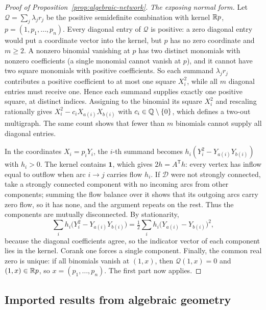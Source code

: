 \begin{proof}[Proof of Proposition~\ref{prop:algebraic-network}]
\emph{The exposing normal form.} Let $\mathcal Q=\sum_j\lambda_jr_j$ be the
positive semidefinite combination with kernel $\mathbb R p$, $p=(1,p_1,\ldots,p_n)$.
Every diagonal entry of $\mathcal Q$ is positive: a zero diagonal entry would
put a coordinate vector into the kernel, but $p$ has no zero coordinate and
$m\ge2$. A nonzero binomial vanishing at $p$ has two distinct monomials with
nonzero coefficients (a single monomial cannot vanish at $p$), and it cannot
have two square monomials with positive coefficients. So each summand
$\lambda_jr_j$ contributes a positive coefficient to at most one square
$X_i^2$, while all $m$ diagonal entries must receive one. Hence each summand
supplies exactly one positive square, at distinct indices. Assigning to the
binomial its square $X_i^2$ and rescaling rationally gives
$X_i^2-c_iX_{a(i)}X_{b(i)}$ with $c_i\in\mathbb Q\setminus\{0\}$, which defines a
two-out multigraph. The same count shows that fewer than $m$ binomials cannot
supply all diagonal entries.

In the coordinates $X_i=p_iY_i$, the $i$-th summand becomes
$h_i(Y_i^2-Y_{a(i)}Y_{b(i)})$ with $h_i>0$. The kernel contains
$\mathbf1$, which gives $2h=A^{\mathsf T}h$: every vertex has inflow equal to
outflow when arc $i\to j$ carries flow $h_i$. If $\mathcal D$ were not
strongly connected, take a strongly connected component with no incoming
arcs from other components; summing the flow balance over it shows that its
outgoing arcs carry zero flow, so it has none, and the argument repeats on
the rest. Thus the components are mutually disconnected. By stationarity,
\[
 \sum_ih_i\bigl(Y_i^2-Y_{a(i)}Y_{b(i)}\bigr)
 =\tfrac12\sum_ih_i\bigl(Y_{a(i)}-Y_{b(i)}\bigr)^2,
\]
because the diagonal coefficients agree, so the indicator vector of each
component lies in the kernel. Corank one forces a single component. Finally,
the common real zero is unique: if all binomials vanish at $(1,x)$, then
$\mathcal Q(1,x)=0$ and $(1,x)\in\mathbb R p$, so $x=(p_1,\ldots,p_n)$. The first part
now applies.
\end{proof}

\subsection{Imported results from algebraic geometry}
\label{app:algebraic-imports}

